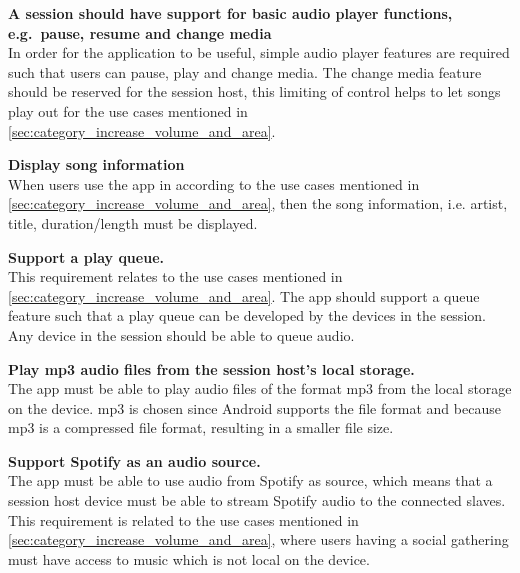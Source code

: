 \begin{eletterate}[resume]
    \item\label{req:basic} \textbf{A session should have support for basic audio player functions, e.g.~pause, resume and change media} \hfill\\
        In order for the application to be useful, simple audio player features are required such that users can pause, play and change media.
        The change media feature should be reserved for the session host, this limiting of control helps to let songs play out for the use cases mentioned in \cref{sec:category_increase_volume_and_area}.

    \item\label{req:info} \textbf{Display song information} \hfill\\
        When users use the app in according to the use cases mentioned in \cref{sec:category_increase_volume_and_area},
        then the song information, i.e. artist, title, duration/length must be displayed.

    \item\label{req:queue} \textbf{Support a play queue.} \hfill\\ 
        This requirement relates to the use cases mentioned in \cref{sec:category_increase_volume_and_area}.
        The app should support a queue feature such that a play queue can be developed by the devices in the session.
        Any device in the session should be able to queue audio.

    \item\label{req:mp3} \textbf{Play mp3 audio files from the session host's local storage.} \hfill\\
        The app must be able to play audio files of the format mp3 from the local storage on the device.
        mp3 is chosen since Android supports the file format and because mp3 is a compressed file format,
        resulting in a smaller file size\cite{android_mp3_support}\cite{mp3_compression}.

    \item\label{req:spotify} \textbf{Support Spotify as an audio source.} \hfill\\
        The app must be able to use audio from Spotify as source,
        which means that a session host device must be able to stream Spotify audio to the connected slaves.
        This requirement is related to the use cases mentioned in \cref{sec:category_increase_volume_and_area},
        where users having a social gathering must have access to music which is not local on the device.
\end{eletterate}

